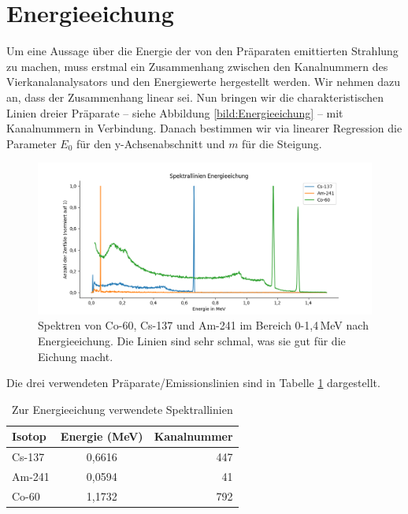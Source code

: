 \section{Energieeichung}
\label{section:Energieeichung}

Um eine Aussage über die Energie der von den Präparaten emittierten Strahlung zu machen, muss erstmal ein Zusammenhang zwischen 
den Kanalnummern des Vierkanalanalysators und den Energiewerte hergestellt werden. Wir nehmen dazu an, dass der Zusammenhang linear sei. Nun bringen wir 
die charakteristischen Linien dreier Präparate – siehe Abbildung \ref{bild:Energieeichung} – mit Kanalnummern in Verbindung. Danach bestimmen 
wir via linearer Regression die Parameter $E_0$  für den y-Achsenabschnitt und $m$ für die Steigung.\\

\begin{figure}[h]
    \centering
    \captionsetup{justification=centering,margin=1cm}
    \includegraphics[width = \linewidth]{Bilder/Auswertung/EnergieeichungLinien.png}
    \caption{Spektren von Co-60, Cs-137 und Am-241 im Bereich 0-1,4\,MeV nach Energieeichung. Die Linien sind sehr schmal, was sie gut für die Eichung macht.}
\end{figure}




Die drei verwendeten Präparate/Emissionslinien  sind in Tabelle \ref{Eichung} dargestellt.
 \begin{table}[h]
    \centering
     \begin{tabular}{lcr}
        Isotop & Energie (MeV) & Kanalnummer \\
        \toprule
         Cs-137 & 0,6616  & 447\\
         Am-241 & 0,0594 & 41\\
         Co-60 & 1,1732 & 792\\
     \end{tabular}
     \caption{Zur Energieeichung verwendete Spektrallinien}
     \label{Eichung}
 \end{table}


